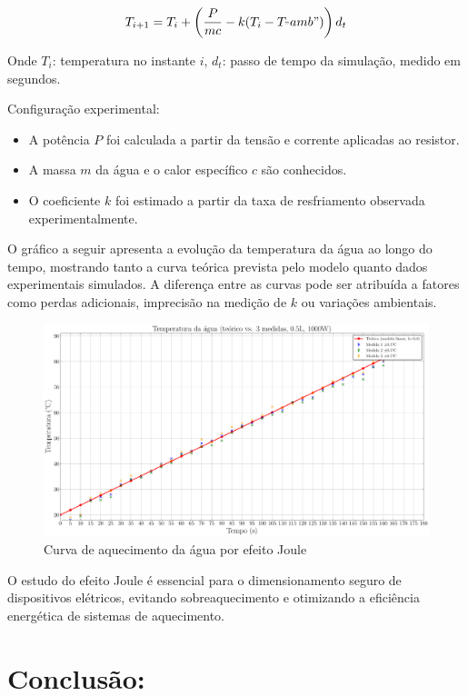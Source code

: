 \documentclass[conference]{IEEEtran}
\begin{document}
\begin{equation}
    T_{i+1} = T_i + \left(\frac{P}{mc} - k (T_i - T_"amb")\right) d_t
\end{equation}

Onde $T_i$: temperatura no instante $i$, $d_t$: passo de tempo da simulação, medido em segundos.

Configuração experimental:
\begin{itemize}
    \item A potência $P$ foi calculada a partir da tensão e corrente aplicadas ao resistor.
    \item A massa $m$ da água e o calor específico $c$ são conhecidos.
    \item O coeficiente $k$ foi estimado a partir da taxa de resfriamento observada experimentalmente.
\end{itemize}

O gráfico a seguir apresenta a evolução da temperatura da água ao longo do tempo, mostrando tanto a curva teórica prevista pelo modelo quanto dados experimentais simulados. A diferença entre as curvas pode ser atribuída a fatores como perdas adicionais, imprecisão na medição de $k$ ou variações ambientais.

\begin{figure}[htbp]
    \centering
    \caption{Curva de aquecimento da água por efeito Joule}
    \label{fig:plot_temperatura}
    \includegraphics[width=0.8\linewidth]{figures/plot_temperatura.pdf}
\end{figure}

O estudo do efeito Joule é essencial para o dimensionamento seguro de dispositivos elétricos, evitando sobreaquecimento e otimizando a eficiência energética de sistemas de aquecimento.

\section{Conclusão:} %
\end{document}
